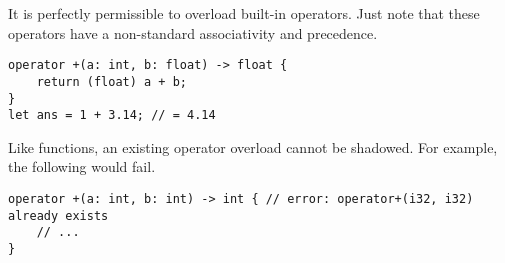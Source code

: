 It is perfectly permissible to overload built-in operators.
Just note that these operators have a non-standard associativity and precedence.

\begin{lstlisting}[language=CustomLang]
operator +(a: int, b: float) -> float {
    return (float) a + b;
}
let ans = 1 + 3.14; // = 4.14
\end{lstlisting}

Like functions, an existing operator overload cannot be shadowed.
For example, the following would fail.

\begin{lstlisting}[language=CustomLang]
operator +(a: int, b: int) -> int { // error: operator+(i32, i32) already exists
    // ...
}
\end{lstlisting}
